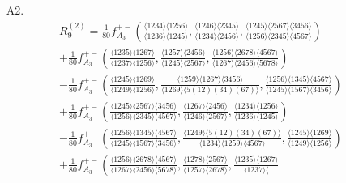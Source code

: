 \documentclass[12pt]{article}
\begin{document}
\begin{itemize}
	\item[A2.] \begin{multline}
	R^{(2)}_9 = \frac{1}{80} f_{A_3}^{+-}\left(\frac{\langle 1234\rangle  \langle
   1256\rangle }{\langle 1236\rangle  \langle 1245\rangle
   },\frac{\langle 1246\rangle  \langle 2345\rangle
   }{\langle 1234\rangle  \langle 2456\rangle
   },\frac{\langle 1245\rangle  \langle 2567\rangle 
   \langle 3456\rangle }{\langle 1256\rangle  \langle
   2345\rangle  \langle 4567\rangle }\right)\\+\frac{1}{80}
   f_{A_3}^{+-}\left(\frac{\langle 1235\rangle  \langle 1267\rangle
   }{\langle 1237\rangle  \langle 1256\rangle
   },\frac{\langle 1257\rangle  \langle 2456\rangle
   }{\langle 1245\rangle  \langle 2567\rangle
   },\frac{\langle 1256\rangle  \langle 2678\rangle 
   \langle 4567\rangle }{\langle 1267\rangle  \langle
   2456\rangle  \langle 5678\rangle }\right)\\-\frac{1}{80}
   f_{A_3}^{+-}\left(\frac{\langle 1245\rangle  \langle 1269\rangle
   }{\langle 1249\rangle  \langle 1256\rangle
   },\frac{\langle 1259\rangle  \langle 1267\rangle 
   \langle 3456\rangle }{\langle 1269\rangle  \langle
   5(12)(34)(67)\rangle },\frac{\langle 1256\rangle 
   \langle 1345\rangle  \langle 4567\rangle }{\langle
   1245\rangle  \langle 1567\rangle  \langle 3456\rangle
   }\right)\\+\frac{1}{80} f_{A_3}^{+-}\left(\frac{\langle 1245\rangle
    \langle 2567\rangle  \langle 3456\rangle }{\langle
   1256\rangle  \langle 2345\rangle  \langle 4567\rangle
   },\frac{\langle 1267\rangle  \langle 2456\rangle
   }{\langle 1246\rangle  \langle 2567\rangle
   },\frac{\langle 1234\rangle  \langle 1256\rangle
   }{\langle 1236\rangle  \langle 1245\rangle
   }\right)\\-\frac{1}{80} f_{A_3}^{+-}\left(\frac{\langle 1256\rangle
    \langle 1345\rangle  \langle 4567\rangle }{\langle
   1245\rangle  \langle 1567\rangle  \langle 3456\rangle
   },\frac{\langle 1249\rangle  \langle
   5(12)(34)(67)\rangle }{\langle 1234\rangle  \langle
   1259\rangle  \langle 4567\rangle },\frac{\langle
   1245\rangle  \langle 1269\rangle }{\langle 1249\rangle
    \langle 1256\rangle }\right)\\+\frac{1}{80}
   f_{A_3}^{+-}\left(\frac{\langle 1256\rangle  \langle 2678\rangle 
   \langle 4567\rangle }{\langle 1267\rangle  \langle
   2456\rangle  \langle 5678\rangle },\frac{\langle
   1278\rangle  \langle 2567\rangle }{\langle 1257\rangle
    \langle 2678\rangle },\frac{\langle 1235\rangle 
   \langle 1267\rangle }{\langle 1237\rangle  \langle
}
\end{multline}
\end{itemize}
\end{document}
